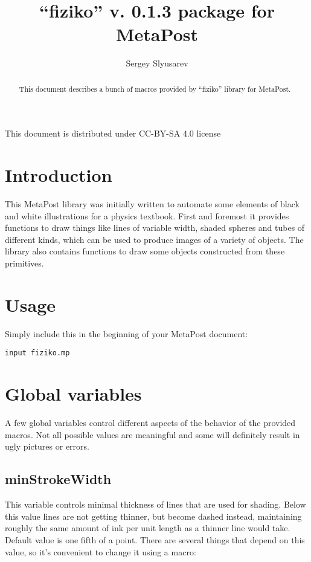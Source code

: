 \documentclass{article}
\author{Sergey Slyusarev}
\title{``fiziko'' v. 0.1.3 package for MetaPost }
\begin{document}
\maketitle

\begin{abstract}
This document describes a bunch of macros provided by ``fiziko'' library for MetaPost.
\end{abstract}

\begin{centering}

This document is distributed under CC-BY-SA 4.0 license 

\cc\bysa

\end{centering}

\section{Introduction}
This MetaPost library was initially written to automate some elements of black and white illustrations for a physics textbook. First and foremost it provides functions to draw things like lines of variable width, shaded spheres and tubes of different kinds, which can be used to produce images of a variety of objects. The library also contains functions to draw some objects constructed from these primitives.

\section{Usage}
Simply include this in the beginning of your MetaPost document:

\begin{lstlisting}
input fiziko.mp
\end{lstlisting}

\section{Global variables}
A few global variables control different aspects of the behavior of the provided macros. Not all possible values are meaningful and some will definitely result in ugly pictures or errors.

\subsection{minStrokeWidth}
This variable controls minimal thickness of lines that are used for shading. Below this value lines are not getting thinner, but become dashed instead, maintaining roughly the same amount of ink per unit length as a thinner line would take. Default value is one fifth of a point. There are several things that depend on this value, so it's convenient to change it using a macro:
\end{document}
